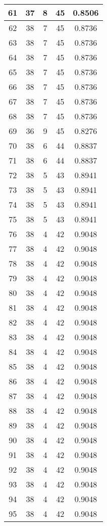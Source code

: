 \documentclass[letterpaper, 12pt]{article}
\begin{document}
\begin{longtable}{|c|c|c|c|c|}
61 & 37 & 8 & 45 & 0.8506 \\
\hline
62 & 38 & 7 & 45 & 0.8736 \\
\hline
63 & 38 & 7 & 45 & 0.8736 \\
\hline
64 & 38 & 7 & 45 & 0.8736 \\
\hline
65 & 38 & 7 & 45 & 0.8736 \\
\hline
66 & 38 & 7 & 45 & 0.8736 \\
\hline
67 & 38 & 7 & 45 & 0.8736 \\
\hline
68 & 38 & 7 & 45 & 0.8736 \\
\hline
69 & 36 & 9 & 45 & 0.8276 \\
\hline
70 & 38 & 6 & 44 & 0.8837 \\
\hline
71 & 38 & 6 & 44 & 0.8837 \\
\hline
72 & 38 & 5 & 43 & 0.8941 \\
\hline
73 & 38 & 5 & 43 & 0.8941 \\
\hline
74 & 38 & 5 & 43 & 0.8941 \\
\hline
75 & 38 & 5 & 43 & 0.8941 \\
\hline
76 & 38 & 4 & 42 & 0.9048 \\
\hline
77 & 38 & 4 & 42 & 0.9048 \\
\hline
78 & 38 & 4 & 42 & 0.9048 \\
\hline
79 & 38 & 4 & 42 & 0.9048 \\
\hline
80 & 38 & 4 & 42 & 0.9048 \\
\hline
81 & 38 & 4 & 42 & 0.9048 \\
\hline
82 & 38 & 4 & 42 & 0.9048 \\
\hline
83 & 38 & 4 & 42 & 0.9048 \\
\hline
84 & 38 & 4 & 42 & 0.9048 \\
\hline
85 & 38 & 4 & 42 & 0.9048 \\
\hline
86 & 38 & 4 & 42 & 0.9048 \\
\hline
87 & 38 & 4 & 42 & 0.9048 \\
\hline
88 & 38 & 4 & 42 & 0.9048 \\
\hline
89 & 38 & 4 & 42 & 0.9048 \\
\hline
90 & 38 & 4 & 42 & 0.9048 \\
\hline
91 & 38 & 4 & 42 & 0.9048 \\
\hline
92 & 38 & 4 & 42 & 0.9048 \\
\hline
93 & 38 & 4 & 42 & 0.9048 \\
\hline
94 & 38 & 4 & 42 & 0.9048 \\
\hline
95 & 38 & 4 & 42 & 0.9048 \\

\end{longtable}
\end{document}
